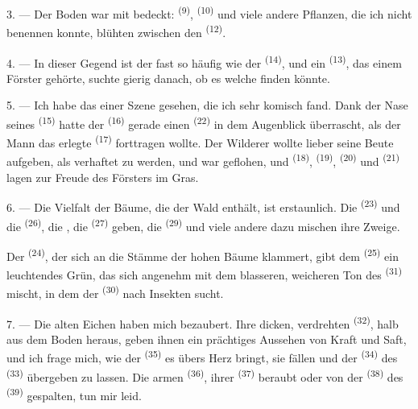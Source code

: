 3. --- Der Boden war mit  bedeckt: 
\textsuperscript{(9)},  \textsuperscript{(10)} und viele andere
Pflanzen, die ich nicht benennen konnte, blühten zwischen den
 \textsuperscript{(12)}.

4. --- In dieser Gegend ist der  fast so häufig wie der
 \textsuperscript{(14)}, und ein 
\textsuperscript{(13)}, das einem Förster gehörte, suchte gierig danach, ob es
welche finden könnte.

\VUsaut{3.0mm}
\VUsaut{3.0mm}

5. --- Ich habe das  einer Szene gesehen, die ich sehr komisch fand.
Dank der Nase seines  \textsuperscript{(15)} hatte der
 \textsuperscript{(16)} gerade einen 
\textsuperscript{(22)} in dem Augenblick überrascht, als der Mann das erlegte
 \textsuperscript{(17)} forttragen wollte. Der Wilderer wollte lieber
seine Beute aufgeben, als verhaftet zu werden, und war geflohen, und
 \textsuperscript{(18)},  \textsuperscript{(19)},
 \textsuperscript{(20)} und 
\textsuperscript{(21)} lagen zur Freude des Försters im Gras.

6. --- Die Vielfalt der Bäume, die der Wald enthält, ist erstaunlich. Die
 \textsuperscript{(23)} und die 
\textsuperscript{(26)}, die , die 
\textsuperscript{(27)} geben, die  \textsuperscript{(29)} und viele
andere dazu mischen ihre Zweige.

Der  \textsuperscript{(24)}, der sich an die Stämme der hohen Bäume
klammert, gibt dem  \textsuperscript{(25)} ein leuchtendes Grün, das
sich angenehm mit dem blasseren, weicheren Ton des 
\textsuperscript{(31)} mischt, in dem der  \textsuperscript{(30)}
nach Insekten sucht.

\VUsaut{3.0mm}
\VUsaut{3.0mm}

7. --- Die alten Eichen haben mich bezaubert. Ihre dicken, verdrehten
 \textsuperscript{(32)}, halb aus dem Boden heraus, geben ihnen ein
prächtiges Aussehen von Kraft und Saft, und ich frage mich, wie der
 \textsuperscript{(35)} es übers Herz bringt, sie fällen und der
 \textsuperscript{(34)} des  \textsuperscript{(33)}
übergeben zu lassen. Die armen  \textsuperscript{(36)}, ihrer
 \textsuperscript{(37)} beraubt oder von der 
\textsuperscript{(38)} des  \textsuperscript{(39)} gespalten,
tun mir leid.

